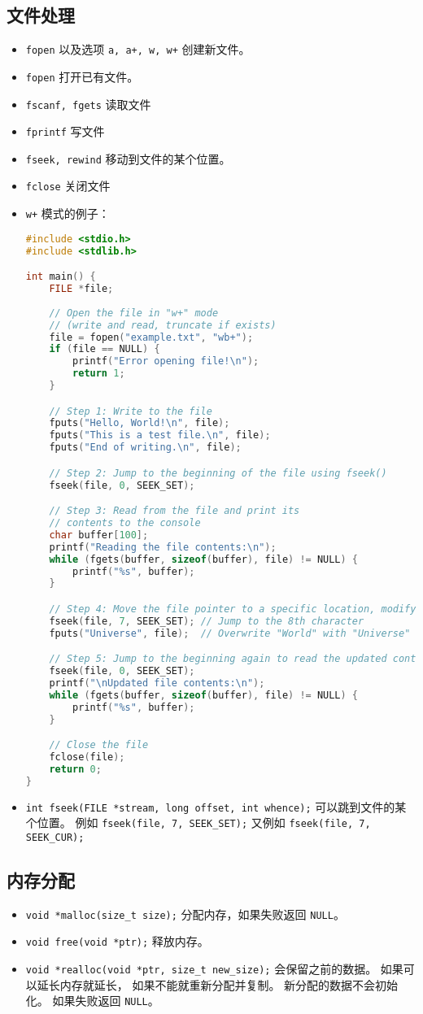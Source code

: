 \subsection{文件处理}
\begin{itemize}
\item \verb`fopen` 以及选项 \verb`a, a+, w, w+` 创建新文件。
\item \verb`fopen` 打开已有文件。
\item \verb`fscanf, fgets` 读取文件
\item \verb`fprintf` 写文件
\item \verb`fseek, rewind` 移动到文件的某个位置。
\item \verb`fclose` 关闭文件
\item \verb`w+` 模式的例子：
\begin{lstlisting}[language=cpp]
#include <stdio.h>
#include <stdlib.h>

int main() {
    FILE *file;
    
    // Open the file in "w+" mode
    // (write and read, truncate if exists)
    file = fopen("example.txt", "wb+");
    if (file == NULL) {
        printf("Error opening file!\n");
        return 1;
    }

    // Step 1: Write to the file
    fputs("Hello, World!\n", file);
    fputs("This is a test file.\n", file);
    fputs("End of writing.\n", file);

    // Step 2: Jump to the beginning of the file using fseek()
    fseek(file, 0, SEEK_SET);

    // Step 3: Read from the file and print its
    // contents to the console
    char buffer[100];
    printf("Reading the file contents:\n");
    while (fgets(buffer, sizeof(buffer), file) != NULL) {
        printf("%s", buffer);
    }

    // Step 4: Move the file pointer to a specific location, modify contents
    fseek(file, 7, SEEK_SET); // Jump to the 8th character
    fputs("Universe", file);  // Overwrite "World" with "Universe"

    // Step 5: Jump to the beginning again to read the updated content
    fseek(file, 0, SEEK_SET);
    printf("\nUpdated file contents:\n");
    while (fgets(buffer, sizeof(buffer), file) != NULL) {
        printf("%s", buffer);
    }

    // Close the file
    fclose(file);
    return 0;
}
\end{lstlisting}
\item \verb`int fseek(FILE *stream, long offset, int whence);` 可以跳到文件的某个位置。 例如 \verb`fseek(file, 7, SEEK_SET);` 又例如 \verb`fseek(file, 7, SEEK_CUR);`
\end{itemize}



\subsection{内存分配}
\begin{itemize}
\item \verb`void *malloc(size_t size);` 分配内存，如果失败返回 \verb`NULL`。
\item \verb`void free(void *ptr);` 释放内存。
\item \verb`void *realloc(void *ptr, size_t new_size);` 会保留之前的数据。 如果可以延长内存就延长， 如果不能就重新分配并复制。 新分配的数据不会初始化。 如果失败返回 \verb`NULL`。
\end{itemize}
